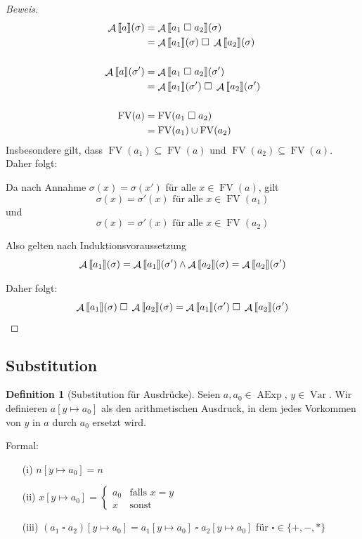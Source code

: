 \documentclass[a4paper,12pt]{article}
\theoremstyle{definition}
\newtheorem{definition}{Definition}[section]
\theoremstyle{plain}
\theoremstyle{remark}
\newcommand{\lsem}{\mathrm{[}\kern-.14em\mathrm{[}}
\newcommand{\rsem}{\mathrm{]}\kern-.14em\mathrm{]}}
\DeclareMathOperator{\AExp}{AExp}
\DeclareMathOperator{\Var}{Var}
\DeclareMathOperator{\A}{\mathcal{A}}
\DeclareMathOperator{\FV}{FV}
\begin{document}
\begin{proof}[Beweis]
    \begin{align*}
        \A\lsem a \rsem(\sigma) & = \A\lsem a_1 \;\square\; a_2 \rsem(\sigma) \\
        & = \A\lsem a_1 \rsem(\sigma) \;\square\; \A\lsem a_2 \rsem(\sigma) \\
        \\
        \A\lsem a \rsem(\sigma') & = \A\lsem a_1 \;\square\; a_2 \rsem(\sigma') \\
        & = \A\lsem a_1 \rsem(\sigma') \;\square\; \A\lsem a_2 \rsem(\sigma') \\
        \\
        \FV(a) & = \FV(a_1 \;\square\; a_2) \\
        & = \FV(a_1) \cup \FV(a_2)
    \end{align*}
    Insbesondere gilt, dass $\FV(a_1) \subseteq \FV(a)$ und $\FV(a_2) \subseteq \FV(a)$. Daher folgt:

    Da nach Annahme $\sigma(x) = \sigma(x')$ für alle $x \in \FV(a)$, gilt
    $$\sigma(x) = \sigma'(x) \text{ für alle } x \in \FV(a_1)$$
    und
    $$\sigma(x) = \sigma'(x) \text{ für alle } x \in \FV(a_2)$$

    Also gelten nach Induktionsvoraussetzung
    $$\A\lsem a_1 \rsem(\sigma) = \A\lsem a_1 \rsem(\sigma') \wedge \A\lsem a_2 \rsem(\sigma) = \A\lsem a_2 \rsem(\sigma')$$

    Daher folgt:
    $$\A\lsem a_1 \rsem(\sigma) \;\square\; \A\lsem a_2 \rsem(\sigma) = \A\lsem a_1 \rsem(\sigma') \;\square\; \A\lsem a_2 \rsem(\sigma')$$
\end{proof}



\subsection{Substitution} \label{section:substitution}

\begin{definition}[Substitution für Ausdrücke] \label{def:substitutionExp}
    Seien $a, a_0 \in \AExp, \, y \in \Var$. Wir definieren $a[y \mapsto a_0]$ als den arithmetischen Ausdruck, in dem jedes Vorkommen von $y$ in $a$ durch $a_0$ ersetzt wird.

    Formal:
    \begin{enumerate}
        \item[(i)] $n[y \mapsto a_0] = n$
        \item[(ii)] $x[y \mapsto a_0] = \begin{cases} a_0 & \text{falls } x = y \\ x & \text{sonst} \end{cases}$
        \item[(iii)] $(a_1 \;\square\; a_2)[y \mapsto a_0] = a_1[y \mapsto a_0] \;\square\; a_2[y \mapsto a_0]$ \quad\quad für $\square \in \{ +, -, * \}$
    \end{enumerate}
\end{definition}
\end{document}
